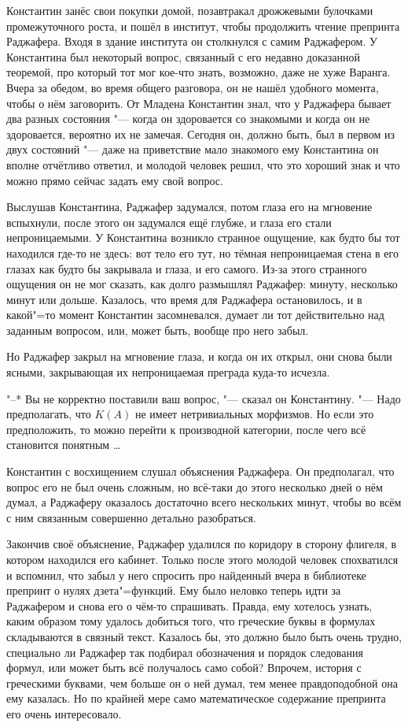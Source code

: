 Константин занёс свои покупки домой, позавтракал дрожжевыми булочками
промежуточного роста, и пошёл в институт, чтобы продолжить чтение препринта
Раджафера.
Входя в здание института он столкнулся с самим Раджафером.
У Константина был некоторый вопрос, связанный с его недавно доказанной теоремой,
про который тот мог кое-что знать, возможно, даже не хуже Варанга.
Вчера за обедом, во время общего разговора, он не нашёл удобного момента, чтобы
о нём заговорить.
От Младена Константин знал, что у Раджафера бывает два разных состояния "---
когда он здоровается со знакомыми и когда он не здоровается, вероятно их не
замечая.
Сегодня он, должно быть, был в первом из двух состояний "--- даже на приветствие
мало знакомого ему Константина он вполне отчётливо ответил, и молодой человек
решил, что это хороший знак и что можно прямо сейчас задать ему свой вопрос.

Выслушав Константина, Раджафер задумался, потом глаза его на мгновение
вспыхнули, после этого он задумался ещё глубже, и глаза его стали
непроницаемыми.
У Константина возникло странное ощущение, как будто бы тот находился где-то не
здесь: вот тело его тут, но тёмная непроницаемая стена в его глазах как будто бы
закрывала и глаза, и его самого.
Из-за этого странного ощущения он не мог сказать, как долго размышлял Раджафер:
минуту, несколько минут или дольше.
Казалось, что время для Раджафера остановилось, и в какой"=то момент Константин
засомневался, думает ли тот действительно над заданным вопросом, или, может
быть, вообще про него забыл.

Но Раджафер закрыл на мгновение глаза, и когда он их открыл, они снова были
ясными, закрывающая их непроницаемая преграда куда-то исчезла.

"--* Вы не корректно поставили ваш вопрос, "--- сказал он Константину.
"--- Надо предполагать, что $K(A)$ не имеет нетривиальных морфизмов.
Но если это предположить, то можно перейти к производной категории, после чего
всё становится понятным \ldots

Константин с восхищением слушал объяснения Раджафера.
Он предполагал, что вопрос его не был очень сложным, но всё-таки до этого
несколько дней о нём думал, а Раджаферу оказалось достаточно всего нескольких
минут, чтобы во всём с ним связанным совершенно детально разобраться.

Закончив своё объяснение, Раджафер удалился по коридору в сторону флигеля, в
котором находился его кабинет.
Только после этого молодой человек спохватился и вспомнил, что забыл у него
спросить про найденный вчера в библиотеке препринт о нулях дзета"=функций.
Ему было неловко теперь идти за Раджафером и снова его о чём-то спрашивать.
Правда, ему хотелось узнать, каким образом тому удалось добиться того, что
греческие буквы в формулах складываются в связный текст.
Казалось бы, это должно было быть очень трудно, специально ли Раджафер так
подбирал обозначения и порядок следования формул, или может быть всё получалось
само собой?
Впрочем, история с греческими буквами, чем больше он о ней думал, тем менее
правдоподобной она ему казалась.
Но по крайней мере само математическое содержание препринта его очень
интересовало.

